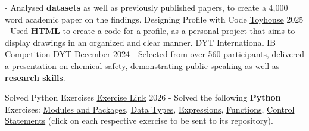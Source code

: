 \documentclass[11pt]{spidercv}
\begin{document}
\begin{MainPart}
{            - Analysed \textbf{datasets} as well as previously published papers, to create a 4,000 word academic paper on the findings.
        }
    \Experience
        {\ColorHighlight}
		{Designing Profile with Code}
		{\href{https://toyhou.se/Rui_ns}{\textcolor[HTML]{2d6930}{\underline{Toyhouse}}}}
        {2025}
        {   
            - Used \textbf{HTML} to create a code for a profile, as a personal project that aims to display drawings in an organized and clear manner.
        }
    \Experience
        {\ColorHighlight}
		{DYT International IB Competition}
		{\href{https://international-dyt.org}{\textcolor[HTML]{2d6930}{\underline{DYT}}}}
        {December 2024}
        {   
          - Selected from over 560 participants, delivered a presentation on chemical safety, demonstrating public-speaking as well as \textbf{research skills}. 
        }


    \Experience
        {\ColorHighlight}
		{Solved Python Exercises}
		{\href{https://github.com/m-mahdavi/teaching/tree/main/exercises/python}{\textcolor[HTML]{2d6930}{\underline{Exercise Link}}}}
        {2026}
        {   
            - Solved the following \textbf{Python} Exercises:
            {\href{https://github.com/Daria-Kara/python_modules_and_packages_exercises}{Modules and Packages}}, {\href{https://github.com/Daria-Kara/python_data_types_exercises}{Data Types}}, {\href{https://github.com/Daria-Kara/python_expressions_exercises}{Expressions}}, {\href{https://github.com/Daria-Kara/python_functions_exercises}{Functions}}, {\href{https://github.com/Daria-Kara/python_control_statements_exercises}{Control Statements}} \textcolor[HTML]{2d6930}{(click on each respective exercise to be sent to its repository).}
        }

    \end{MainPart}

    
\end{document}
